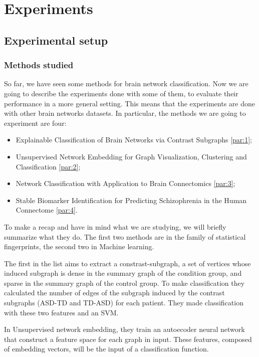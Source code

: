 \chapter{Experiments}
\label{chap:3}
\section{Experimental setup}
\subsection{Methods studied}
So far, we have seen some methods for brain network classification. Now we are going to describe the experiments done with some of them, to evaluate their performance in a more general setting. This means that the experiments are done with other brain networks datasets. In particular, the methods we are going to experiment are four:
\begin{itemize}
	\item Explainable Classification of Brain Networks via Contrast Subgraphs \ref{par:1};
	\item Unsupervised Network Embedding for Graph Visualization, Clustering and Classification \ref{par:2};
	\item Network Classification with Application to Brain Connectomics \ref{par:3};
	\item Stable Biomarker Identification for Predicting Schizophrenia in the Human Connectome \ref{par:4}.
\end{itemize}
To make a recap and have in mind what we are studying, we will briefly summarize what they do. The first two methods are in the family of statistical fingerprints, the second two in Machine learning. 
\vspace{0.5cm}

The first in the list aims to extract a constrast-subgraph, a set of vertices whose induced subgraph is dense in the summary graph of the condition group, and sparse in the summary graph of the control group. To make classification they calculated the number of edges of the subgraph induced by the contrast subgraphs (ASD-TD and TD-ASD) for each patient. They made classification with these two features and an SVM.
\vspace{0.5cm}

In Unsupervised network embedding, they train an autoecoder neural network that construct a feature space for each graph in input. These features, composed of embedding vectors, will be the input of a classification function. 
\vspace{0.5cm}

